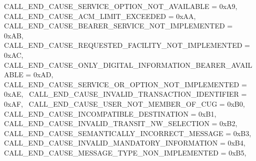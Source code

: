 \begin{DoxyItemize}
 C\+A\+L\+L\+\_\+\+E\+N\+D\+\_\+\+C\+A\+U\+S\+E\+\_\+\+S\+E\+R\+V\+I\+C\+E\+\_\+\+O\+P\+T\+I\+O\+N\+\_\+\+N\+O\+T\+\_\+\+A\+V\+A\+I\+L\+A\+B\+LE = 0x\+A9,~\newline
 C\+A\+L\+L\+\_\+\+E\+N\+D\+\_\+\+C\+A\+U\+S\+E\+\_\+\+A\+C\+M\+\_\+\+L\+I\+M\+I\+T\+\_\+\+E\+X\+C\+E\+E\+D\+ED = 0x\+AA,~\newline
 C\+A\+L\+L\+\_\+\+E\+N\+D\+\_\+\+C\+A\+U\+S\+E\+\_\+\+B\+E\+A\+R\+E\+R\+\_\+\+S\+E\+R\+V\+I\+C\+E\+\_\+\+N\+O\+T\+\_\+\+I\+M\+P\+L\+E\+M\+E\+N\+T\+ED = 0x\+AB,~\newline
 C\+A\+L\+L\+\_\+\+E\+N\+D\+\_\+\+C\+A\+U\+S\+E\+\_\+\+R\+E\+Q\+U\+E\+S\+T\+E\+D\+\_\+\+F\+A\+C\+I\+L\+I\+T\+Y\+\_\+\+N\+O\+T\+\_\+\+I\+M\+P\+L\+E\+M\+E\+N\+T\+ED = 0x\+AC,~\newline
 C\+A\+L\+L\+\_\+\+E\+N\+D\+\_\+\+C\+A\+U\+S\+E\+\_\+\+O\+N\+L\+Y\+\_\+\+D\+I\+G\+I\+T\+A\+L\+\_\+\+I\+N\+F\+O\+R\+M\+A\+T\+I\+O\+N\+\_\+\+B\+E\+A\+R\+E\+R\+\_\+\+A\+V\+A\+I\+L\+A\+B\+LE = 0x\+AD,~\newline
 C\+A\+L\+L\+\_\+\+E\+N\+D\+\_\+\+C\+A\+U\+S\+E\+\_\+\+S\+E\+R\+V\+I\+C\+E\+\_\+\+O\+R\+\_\+\+O\+P\+T\+I\+O\+N\+\_\+\+N\+O\+T\+\_\+\+I\+M\+P\+L\+E\+M\+E\+N\+T\+ED = 0x\+AE,~\newline
 C\+A\+L\+L\+\_\+\+E\+N\+D\+\_\+\+C\+A\+U\+S\+E\+\_\+\+I\+N\+V\+A\+L\+I\+D\+\_\+\+T\+R\+A\+N\+S\+A\+C\+T\+I\+O\+N\+\_\+\+I\+D\+E\+N\+T\+I\+F\+I\+ER = 0x\+AF,~\newline
 C\+A\+L\+L\+\_\+\+E\+N\+D\+\_\+\+C\+A\+U\+S\+E\+\_\+\+U\+S\+E\+R\+\_\+\+N\+O\+T\+\_\+\+M\+E\+M\+B\+E\+R\+\_\+\+O\+F\+\_\+\+C\+UG = 0x\+B0,~\newline
 C\+A\+L\+L\+\_\+\+E\+N\+D\+\_\+\+C\+A\+U\+S\+E\+\_\+\+I\+N\+C\+O\+M\+P\+A\+T\+I\+B\+L\+E\+\_\+\+D\+E\+S\+T\+I\+N\+A\+T\+I\+ON = 0x\+B1,~\newline
 C\+A\+L\+L\+\_\+\+E\+N\+D\+\_\+\+C\+A\+U\+S\+E\+\_\+\+I\+N\+V\+A\+L\+I\+D\+\_\+\+T\+R\+A\+N\+S\+I\+T\+\_\+\+N\+W\+\_\+\+S\+E\+L\+E\+C\+T\+I\+ON = 0x\+B2,~\newline
 C\+A\+L\+L\+\_\+\+E\+N\+D\+\_\+\+C\+A\+U\+S\+E\+\_\+\+S\+E\+M\+A\+N\+T\+I\+C\+A\+L\+L\+Y\+\_\+\+I\+N\+C\+O\+R\+R\+E\+C\+T\+\_\+\+M\+E\+S\+S\+A\+GE = 0x\+B3,~\newline
 C\+A\+L\+L\+\_\+\+E\+N\+D\+\_\+\+C\+A\+U\+S\+E\+\_\+\+I\+N\+V\+A\+L\+I\+D\+\_\+\+M\+A\+N\+D\+A\+T\+O\+R\+Y\+\_\+\+I\+N\+F\+O\+R\+M\+A\+T\+I\+ON = 0x\+B4,~\newline
 C\+A\+L\+L\+\_\+\+E\+N\+D\+\_\+\+C\+A\+U\+S\+E\+\_\+\+M\+E\+S\+S\+A\+G\+E\+\_\+\+T\+Y\+P\+E\+\_\+\+N\+O\+N\+\_\+\+I\+M\+P\+L\+E\+M\+E\+N\+T\+ED = 0x\+B5,~\newline

\end{DoxyItemize}
